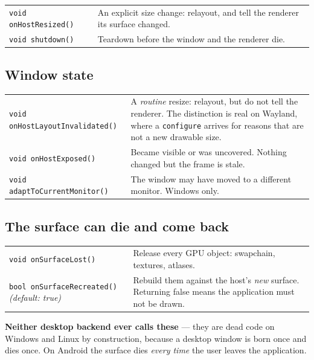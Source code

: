 \documentclass[11pt,a4paper]{article}
\begin{document}
\begin{longtable}{@{}p{}p{}@{}}
\toprule
\endhead
\texttt{void onHostResized()} &
An explicit size change: relayout, and tell the renderer its surface changed. \\
\addlinespace
\texttt{void shutdown()} &
Teardown before the window and the renderer die. \\
\bottomrule
\end{longtable}

\subsection{Window state}

\begin{longtable}{@{}p{}p{}@{}}
\toprule
\endhead
\texttt{void onHostLayoutInvalidated()} &
A \emph{routine} resize: relayout, but do not tell the renderer. The
distinction is real on Wayland, where a \texttt{configure} arrives for reasons
that are not a new drawable size. \\
\addlinespace
\texttt{void onHostExposed()} &
Became visible or was uncovered. Nothing changed but the frame is stale. \\
\addlinespace
\texttt{void adaptToCurrentMonitor()} &
The window may have moved to a different monitor. Windows only. \\
\bottomrule
\end{longtable}

\subsection{The surface can die and come back}

\begin{longtable}{@{}p{}p{}@{}}
\toprule
\endhead
\texttt{void onSurfaceLost()} &
Release every GPU object: swapchain, textures, atlases. \\
\addlinespace
\texttt{bool onSurfaceRecreated()} \newline \emph{(default: true)} &
Rebuild them against the host's \emph{new} surface. Returning false means the
application must not be drawn. \\
\bottomrule
\end{longtable}

\textbf{Neither desktop backend ever calls these} --- they are dead code on
Windows and Linux by construction, because a desktop window is born once and
dies once. On Android the surface dies \emph{every time} the user leaves the
application.
\end{document}

